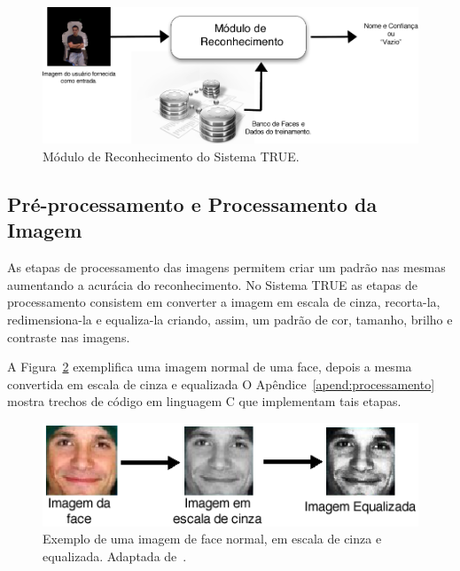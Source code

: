 		\begin{figure}[hbt]
			\begin{center}
				\includegraphics[scale=2.0]{figuras/4.ProblemaEProposta/reconhecimento-simples.png}
			\end{center}
			\caption{Módulo de Reconhecimento do Sistema TRUE.}
			\label{fig:processo-reconhecimento}
		\end{figure}


	\subsection{Pré-processamento e Processamento da Imagem}
		
		As etapas de processamento das imagens permitem criar um padrão nas mesmas aumentando a acurácia do reconhecimento. No Sistema TRUE as etapas de processamento consistem em converter a imagem em escala de cinza, recorta-la, redimensiona-la e equaliza-la criando, assim, um padrão de cor, tamanho, brilho e contraste nas imagens.

		A Figura~\ref{fig:greyscale} exemplifica uma imagem normal de uma face,
		depois a mesma convertida em escala de cinza e equalizada O
		Apêndice~\ref{apend:processamento} mostra trechos de código em linguagem C
		que implementam tais etapas.

		\begin{figure}[hbt]
			\begin{center}
				\includegraphics[scale=0.7]{figuras/4.ProblemaEProposta/greyscale.png}
			\end{center}
			\caption{Exemplo de uma imagem de face normal, em escala de cinza e equalizada. Adaptada de~\cite{shervin}.}
			\label{fig:greyscale}
		\end{figure}

